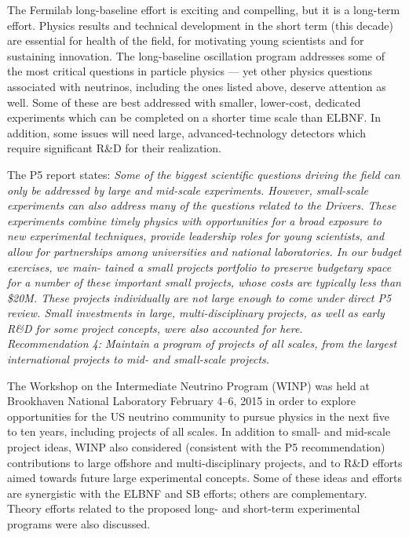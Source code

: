 The Fermilab long-baseline effort is exciting and compelling, but it
is a long-term effort.  Physics results and technical development in
the short term (this decade) are essential for health of the field,
for motivating young scientists and for sustaining innovation.  The
long-baseline oscillation program addresses some of the most critical
questions in particle physics --- yet other physics questions
associated with neutrinos, including the ones listed above, deserve
attention as well.  Some of these are best addressed with smaller,
lower-cost, dedicated experiments which can be completed
on a shorter time scale than ELBNF.  In addition, some issues will
need large, advanced-technology detectors which require
significant R\&D for their realization.

The P5 report states:
\textit{Some of the biggest scientific questions driving the field can only be
addressed by large and mid-scale experiments. However, small-scale
experiments can also address many of the questions related to the
Drivers. These experiments combine timely physics with opportunities
for a broad exposure to new experimental techniques, provide
leadership roles for young scientists, and allow for partnerships
among universities and national laboratories. In our budget exercises,
we main- tained a small projects portfolio to preserve budgetary space
for a number of these important small projects, whose costs are
typically less than \$20M. These projects individually are not large
enough to come under direct P5 review. Small investments in large,
multi-disciplinary projects, as well as early R\&D for some project
concepts, were also accounted for here.}\\
\textit{{Recommendation 4: Maintain a program of projects of all
  scales, from the largest international projects to mid- and
  small-scale projects.}}

The Workshop on the Intermediate Neutrino Program (WINP) was held at
Brookhaven National Laboratory February 4--6, 2015 in order to explore
opportunities for the US neutrino community to pursue physics in the
next five to ten years, including projects of all scales.  In addition
to small- and mid-scale project ideas, WINP also considered
(consistent with the P5 recommendation) contributions to large
offshore and multi-disciplinary projects, and to R\&D efforts aimed
towards future large experimental concepts.  Some of these ideas and
efforts are synergistic with the ELBNF and SB efforts; others are
complementary.  Theory efforts related to the proposed long- and
short-term experimental programs were also discussed.

